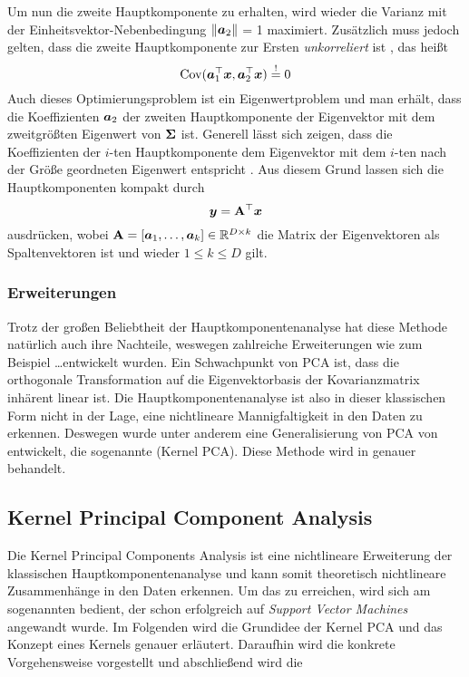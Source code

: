 Um nun die zweite Hauptkomponente zu erhalten, wird wieder die Varianz mit der
Einheitsvektor-Nebenbedingung $\lVert\bm{a}_2\rVert$ = 1 maximiert. Zusätzlich muss jedoch gelten,
dass die zweite Hauptkomponente zur Ersten \textit{unkorreliert} ist \parencite[5]{Jolliffe.2002}, das heißt
\begin{equation}
	\operatorname{Cov}(\bm{a}_1^\top\bm{x}, \bm{a}_2^\top\bm{x}) \overset{!}{=} 0
\end{equation}
Auch dieses Optimierungsproblem ist ein Eigenwertproblem und man erhält, dass die Koeffizienten $\bm{a}_2$ der zweiten Hauptkomponente der Eigenvektor mit dem zweitgrößten Eigenwert von $\mathbf{\Sigma}$ ist.
Generell lässt sich zeigen, dass die Koeffizienten der $i$-ten Hauptkomponente dem Eigenvektor mit dem $i$-ten nach der Größe geordneten Eigenwert entspricht \parencite[6]{Jolliffe.2002}. Aus diesem Grund lassen sich die Hauptkomponenten kompakt durch
\begin{equation}
	\bm{y} = \mathbf{A}^\top \bm{x}
\end{equation}
ausdrücken, wobei $\mathbf{A} = [\bm{a}_1,\ldots,\bm{a}_k] \in \mathbb{R}^{D \times k}$ die Matrix der Eigenvektoren als Spaltenvektoren ist und wieder $1 \leq k \leq D$ gilt.

\subsubsection{Erweiterungen}
\label{ch:MethodenDerDimRed:statistisch:PCA:Erweiterungen}
Trotz der großen Beliebtheit der Hauptkomponentenanalyse hat diese Methode natürlich auch ihre Nachteile, weswegen zahlreiche Erweiterungen wie zum Beispiel \ldots\addref entwickelt wurden.
Ein Schwachpunkt von PCA ist, dass die orthogonale Transformation auf die Eigenvektorbasis der Kovarianzmatrix inhärent linear ist. Die Hauptkomponentenanalyse ist also in dieser klassischen Form nicht in der Lage, eine nichtlineare Mannigfaltigkeit in den Daten zu erkennen. Deswegen wurde unter anderem eine Generalisierung von PCA von \textcite{Scholkopf.1997} entwickelt, die sogenannte  (Kernel PCA). Diese Methode wird in  genauer behandelt.

\subsection{Kernel Principal Component Analysis}
\label{ch:MethodenDerDimRed:statistisch:kPCA}
Die Kernel Principal Components Analysis \parencite{Scholkopf.1997} ist eine nichtlineare Erweiterung der klassischen Hauptkomponentenanalyse
und kann somit theoretisch nichtlineare Zusammenhänge in den Daten erkennen. Um das zu erreichen,
wird sich am sogenannten  bedient, der schon erfolgreich auf \textit{Support
	Vector Machines} \parencite{Boser.1992} angewandt wurde. Im Folgenden wird die Grundidee der Kernel PCA und das Konzept
eines Kernels genauer erläutert. Daraufhin wird die konkrete Vorgehensweise vorgestellt und
abschließend wird die


